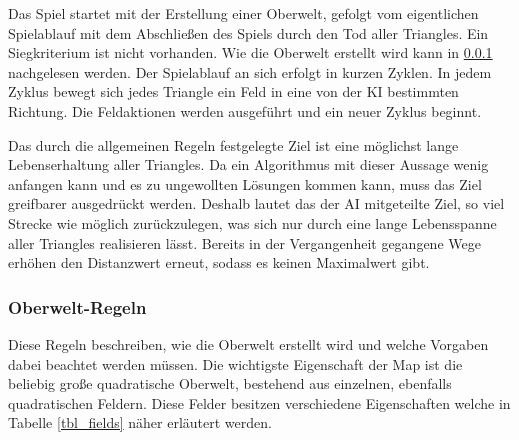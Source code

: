Das Spiel startet mit der Erstellung einer Oberwelt, gefolgt vom eigentlichen Spielablauf mit dem Abschließen des Spiels durch den Tod aller Triangles. Ein Siegkriterium ist nicht vorhanden. Wie die Oberwelt erstellt wird kann in \ref{subsubsec_oberweltregeln} nachgelesen werden. Der Spielablauf an sich erfolgt in kurzen Zyklen. In jedem Zyklus bewegt sich jedes Triangle ein Feld in eine von der KI bestimmten Richtung. Die Feldaktionen werden ausgeführt und ein neuer Zyklus beginnt.

Das durch die allgemeinen Regeln festgelegte Ziel ist eine möglichst lange Lebenserhaltung aller Triangles. Da ein Algorithmus mit dieser Aussage wenig anfangen kann und es zu ungewollten Lösungen kommen kann, muss das Ziel greifbarer ausgedrückt werden. Deshalb lautet das der AI mitgeteilte Ziel, so viel Strecke wie möglich zurückzulegen, was sich nur durch eine lange Lebensspanne aller Triangles realisieren lässt. Bereits in der Vergangenheit gegangene Wege erhöhen den Distanzwert erneut, sodass es keinen Maximalwert gibt.

\subsubsection{Oberwelt-Regeln}
\label{subsubsec_oberweltregeln}
Diese Regeln beschreiben, wie die Oberwelt erstellt wird und welche Vorgaben dabei beachtet werden müssen. Die wichtigste Eigenschaft der Map ist die beliebig große quadratische Oberwelt, bestehend aus einzelnen, ebenfalls quadratischen Feldern. Diese Felder besitzen verschiedene Eigenschaften welche in Tabelle \ref{tbl_fields} näher erläutert werden. \\

